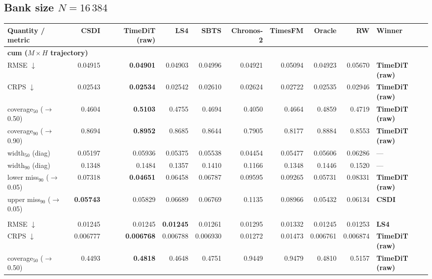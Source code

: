 \documentclass[11pt,a4paper]{article}
\begin{document}
\begin{landscape}
\subsection{Bank size $N = 16\,384$}
\begin{center}\footnotesize
\begin{tabular}{lrrrrrrrrl}
\toprule
Quantity / metric & CSDI & TimeDiT (raw) & LS4 & SBTS & Chronos-2 & TimesFM & Oracle & RW & Winner \\
\midrule
\multicolumn{10}{l}{\textbf{cum ($M\times H$ trajectory)}} \\
RMSE $\downarrow$ & 0.04915 & \textbf{0.04901} & 0.04903 & 0.04996 & 0.04921 & 0.05094 & 0.04923 & 0.05670 & \textbf{TimeDiT (raw)} \\
CRPS $\downarrow$ & 0.02543 & \textbf{0.02534} & 0.02542 & 0.02610 & 0.02624 & 0.02722 & 0.02535 & 0.02946 & \textbf{TimeDiT (raw)} \\
coverage$_{50}$ ($\to$0.50) & 0.4604 & \textbf{0.5103} & 0.4755 & 0.4694 & 0.4050 & 0.4664 & 0.4859 & 0.4719 & \textbf{TimeDiT (raw)} \\
coverage$_{90}$ ($\to$0.90) & 0.8694 & \textbf{0.8952} & 0.8685 & 0.8644 & 0.7905 & 0.8177 & 0.8884 & 0.8553 & \textbf{TimeDiT (raw)} \\
width$_{50}$ (diag) & 0.05197 & 0.05936 & 0.05375 & 0.05538 & 0.04454 & 0.05477 & 0.05606 & 0.06286 & --- \\
width$_{90}$ (diag) & 0.1348 & 0.1484 & 0.1357 & 0.1410 & 0.1166 & 0.1348 & 0.1446 & 0.1520 & --- \\
lower miss$_{90}$ ($\to$0.05) & 0.07318 & \textbf{0.04651} & 0.06458 & 0.06787 & 0.09595 & 0.09265 & 0.05731 & 0.08331 & \textbf{TimeDiT (raw)} \\
upper miss$_{90}$ ($\to$0.05) & \textbf{0.05743} & 0.05829 & 0.06689 & 0.06769 & 0.1135 & 0.08966 & 0.05432 & 0.06134 & \textbf{CSDI} \\
\addlinespace
\multicolumn{10}{l}{\textbf{step ($M\times H$)}} \\
RMSE $\downarrow$ & 0.01245 & 0.01245 & \textbf{0.01245} & 0.01261 & 0.01295 & 0.01332 & 0.01245 & 0.01253 & \textbf{LS4} \\
CRPS $\downarrow$ & 0.006777 & \textbf{0.006768} & 0.006788 & 0.006930 & 0.01272 & 0.01473 & 0.006761 & 0.006874 & \textbf{TimeDiT (raw)} \\
coverage$_{50}$ ($\to$0.50) & 0.4493 & \textbf{0.4818} & 0.4648 & 0.4751 & 0.9449 & 0.9479 & 0.4810 & 0.5157 & \textbf{TimeDiT (raw)} \\

\end{tabular}
\end{center}
\end{landscape}
\end{document}
